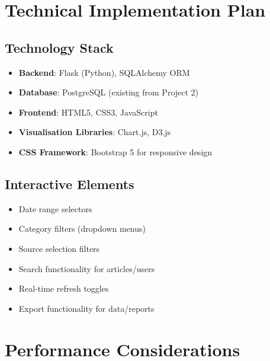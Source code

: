 \documentclass[12pt,a4paper]{article}
\begin{document}
\section{Technical Implementation Plan}

\subsection{Technology Stack}
\begin{itemize}
    \item \textbf{Backend}: Flask (Python), SQLAlchemy ORM
    \item \textbf{Database}: PostgreSQL (existing from Project 2)
    \item \textbf{Frontend}: HTML5, CSS3, JavaScript
    \item \textbf{Visualisation Libraries}: Chart.js, D3.js
    \item \textbf{CSS Framework}: Bootstrap 5 for responsive design
\end{itemize}

\subsection{Interactive Elements}
\begin{itemize}
    \item Date range selectors
    \item Category filters (dropdown menus)
    \item Source selection filters
    \item Search functionality for articles/users
    \item Real-time refresh toggles
    \item Export functionality for data/reports
\end{itemize}

\section{Performance Considerations}
\end{document}
